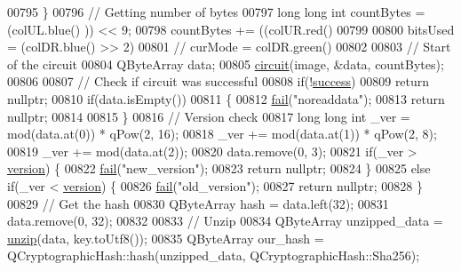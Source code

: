\begin{DoxyCode}
00795     \}
00796     \textcolor{comment}{// Getting number of bytes}
00797     \textcolor{keywordtype}{long} \textcolor{keywordtype}{long} \textcolor{keywordtype}{int} countBytes = (colUL.blue() %
      )) << 9;
00798     countBytes += ((colUR.red() %
00799 
00800     bitsUsed = (colDR.blue() >> 2) %
00801     \textcolor{comment}{// curMode = colDR.green() %
00802 
00803     \textcolor{comment}{// Start of the circuit}
00804     QByteArray data;
00805     \hyperlink{class_model_p_c_a1d0091062a0c836b283ec2f67411623b}{circuit}(image, &data, countBytes);
00806 
00807     \textcolor{comment}{// Check if circuit was successful}
00808     \textcolor{keywordflow}{if}(!\hyperlink{class_model_p_c_a945ffbbc44a832b953c191debd448f4c}{success})
00809         \textcolor{keywordflow}{return} \textcolor{keyword}{nullptr};
00810     \textcolor{keywordflow}{if}(data.isEmpty())
00811     \{
00812         \hyperlink{class_model_p_c_a47464b59b7e37fcee25e55475708aabd}{fail}(\textcolor{stringliteral}{"noreaddata"});
00813         \textcolor{keywordflow}{return} \textcolor{keyword}{nullptr};
00814 
00815     \}
00816     \textcolor{comment}{// Version check}
00817     \textcolor{keywordtype}{long} \textcolor{keywordtype}{long} \textcolor{keywordtype}{int} \_ver = mod(data.at(0)) * qPow(2, 16);
00818     \_ver += mod(data.at(1)) * qPow(2, 8);
00819     \_ver += mod(data.at(2));
00820     data.remove(0, 3);
00821     \textcolor{keywordflow}{if}(\_ver > \hyperlink{class_model_p_c_a5af48ab89e19be42a94c34ba00249401}{version}) \{
00822         \hyperlink{class_model_p_c_a47464b59b7e37fcee25e55475708aabd}{fail}(\textcolor{stringliteral}{"new\_version"});
00823         \textcolor{keywordflow}{return} \textcolor{keyword}{nullptr};
00824     \}
00825     \textcolor{keywordflow}{else} \textcolor{keywordflow}{if}(\_ver < \hyperlink{class_model_p_c_a5af48ab89e19be42a94c34ba00249401}{version}) \{
00826         \hyperlink{class_model_p_c_a47464b59b7e37fcee25e55475708aabd}{fail}(\textcolor{stringliteral}{"old\_version"});
00827         \textcolor{keywordflow}{return} \textcolor{keyword}{nullptr};
00828     \}
00829     \textcolor{comment}{// Get the hash}
00830     QByteArray hash = data.left(32);
00831     data.remove(0, 32);
00832 
00833     \textcolor{comment}{// Unzip}
00834     QByteArray unzipped\_data = \hyperlink{class_model_p_c_a6da88f166785a49f73b22c169f956fd0}{unzip}(data, key.toUtf8());
00835     QByteArray our\_hash = QCryptographicHash::hash(unzipped\_data, QCryptographicHash::Sha256);
}
\end{DoxyCode}
